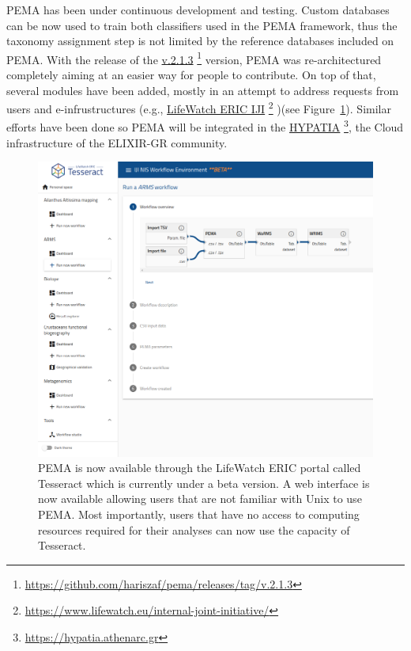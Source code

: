       PEMA has been under continuous development and testing.
      Custom databases can be now used to train both classifiers used in the PEMA framework, thus
      the taxonomy assignment step is not limited by the reference databases included on PEMA.
      With the release of the \href{https://github.com/hariszaf/pema/releases/tag/v.2.1.3}{v.2.1.3}
      \footnote{\href{https://github.com/hariszaf/pema/releases/tag/v.2.1.3}{https://github.com/hariszaf/pema/releases/tag/v.2.1.3}}
      version, PEMA was re-architectured completely aiming at an easier way for people to contribute. 
      On top of that, several modules have been added, mostly in an attempt to address requests from users and
      e-infrustructures (e.g., \href{https://www.lifewatch.eu/internal-joint-initiative/}{LifeWatch ERIC IJI}
      \footnote{\href{https://www.lifewatch.eu/internal-joint-initiative/}{https://www.lifewatch.eu/internal-joint-initiative/}}
      )(see Figure~\ref{fig:pema-lw}). 
      Similar efforts have been done so PEMA will be integrated in the 
      \href{https://hypatia.athenarc.gr/}{HYPATIA}
      \footnote{\href{https://hypatia.athenarc.gr/}{https://hypatia.athenarc.gr}}, 
      the Cloud infrastructure of the ELIXIR-GR community.


      \begin{figure}[h]
         \centering
         \includegraphics[width=0.95\columnwidth]{figures/pema_lw.png}
         \caption[PEMA at LifeWatch ERIC Tesseract portal]{
            PEMA is now available through the LifeWatch ERIC portal called Tesseract which is currently under a beta version. 
            A web interface is now available allowing users that are not familiar with Unix to use PEMA.
            Most importantly, users that have no access to computing resources required for their analyses
            can now use the capacity of Tesseract.  
         }
         \label{fig:pema-lw}
      \end{figure}

